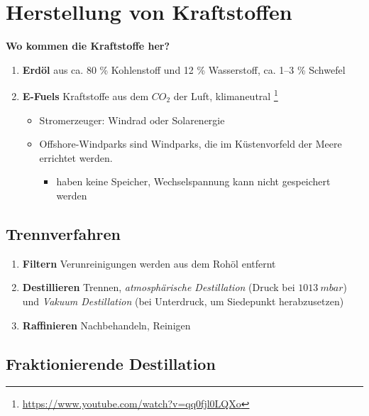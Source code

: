 \section{Herstellung von
Kraftstoffen}\label{herstellung-von-kraftstoffen}

\textbf{Wo kommen die Kraftstoffe her?}

\begin{enumerate}
\item
  \textbf{Erdöl} aus ca. 80 \% Kohlenstoff und 12 \% Wasserstoff, ca.
  1--3 \% Schwefel
\item
  \textbf{E-Fuels} Kraftstoffe aus dem $CO_2$ der Luft, klimaneutral
  \footnote{\url{https://www.youtube.com/watch?v=qq0fjl0LQXo}}

  \begin{itemize}
  \item
    Stromerzeuger: Windrad oder Solarenergie
  \item
    Offshore-Windparks sind Windparks, die im Küstenvorfeld der Meere
    errichtet werden.

    \begin{itemize}
    \item
      haben keine Speicher, Wechselspannung kann nicht gespeichert
      werden
    \end{itemize}
  \end{itemize}
\end{enumerate}

\subsection{Trennverfahren}\label{trennverfahren}

\begin{enumerate}
\item
  \textbf{Filtern} Verunreinigungen werden aus dem Rohöl entfernt
\item
  \textbf{Destillieren} Trennen, \emph{atmosphärische Destillation}
  (Druck bei $1013~mbar$) und \emph{Vakuum Destillation} (bei
  Unterdruck, um Siedepunkt herabzusetzen)
\item
  \textbf{Raffinieren} Nachbehandeln, Reinigen
\end{enumerate}

\subsection{Fraktionierende
Destillation}\label{fraktionierende-destillation}


